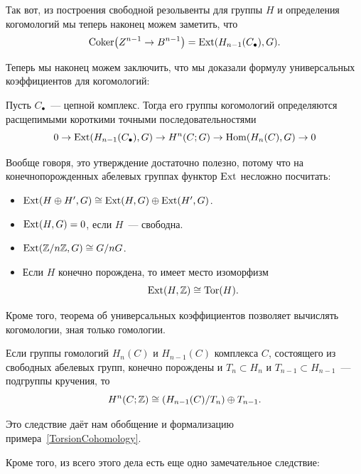     Так вот, из построения свободной резольвенты для группы $H$ и определения когомологий мы теперь наконец можем заметить, что
    \[ \Coker\lr*{Z^{n - 1} \to B^{n - 1}} = \Ext\lr*{H_{n - 1}(C_{\bullet}), G}. \]

    Теперь мы наконец можем заключить, что мы доказали формулу универсальных коэффициентов для когомологий:

    \begin{theorem}
        Пусть $C_{\bullet}$~--- цепной комплекс. Тогда его группы когомологий определяются расщепимыми короткими точными последовательностями
        \[ 0 \to \Ext\lr*{H_{n - 1}(C_{\bullet}), G} \to H^{n}(C; G) \to \Hom\lr*{H_{n}(C), G} \to 0 \]
    \end{theorem}

    Вообще говоря, это утверждение достаточно полезно, потому что на конечнопорожденных абелевых группах функтор $\operatorname{Ext}$ несложно посчитать:
    \begin{itemize}
        \item $\Ext\lr*{H \oplus H', G} \cong \Ext\lr*{H, G} \oplus \Ext\lr*{H', G}$.
        \item $\Ext\lr*{H, G} = 0$, если $H$~--- свободна.
        \item $\operatorname{Ext}(\mathbb{Z}/n\mathbb{Z}, G) \cong G/nG$.
        \item Если $H$ конечно порождена, то имеет место изоморфизм
         \[ \Ext(H, \Z) \cong \mathrm{Tor}\lr*{H}. \]
    \end{itemize}

    Кроме того, теорема об универсальных коэффициентов позволяет вычислять когомологии, зная только гомологии.
    \begin{corollary}
        Если группы гомологий $H_n(C)$ и $H_{n - 1}(C)$ комплекса $C$, состоящего из свободных абелевых групп, конечно порождены и $T_n \subset H_n$ и $T_{n - 1} \subset H_{n - 1}$~--- подгруппы кручения, то
        \[ H^{n}\lr*{C; \Z} \cong (H_{n - 1}(C)/T_n) \oplus T_{n - 1}.\]
    \end{corollary}

    Это следствие даёт нам обобщение и формализацию примера~\ref{TorsionCohomology}.

    Кроме того, из всего этого дела есть еще одно замечательное следствие:

